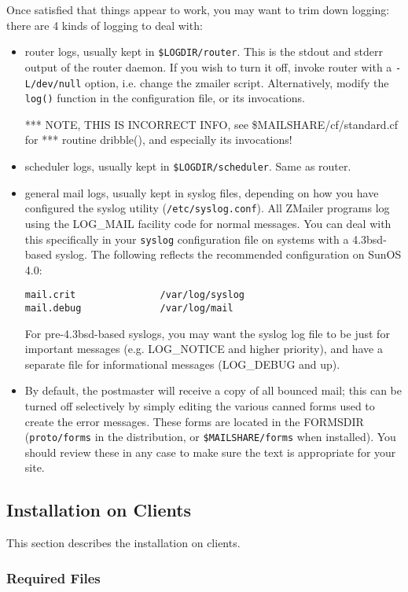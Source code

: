 Once satisfied that things appear to work, you may want to trim down
logging: there are 4 kinds of logging to deal with:
\begin{itemize}
\item router logs, usually kept in {\tt \$LOGDIR/router}.  This is the stdout
and stderr output of the router daemon.  If you wish to turn it off,
invoke router with a {\tt -L/dev/null} option, i.e. change the zmailer
script.  Alternatively, modify the {\tt log()} function in the
configuration file, or its invocations.

*** NOTE, THIS IS INCORRECT INFO, see  \$MAILSHARE/cf/standard.cf for
*** routine   dribble(),  and especially its invocations!
\item scheduler logs, usually kept in {\tt \$LOGDIR/scheduler}.  Same as router.
\item general mail logs, usually kept in syslog files, depending on how
you have configured the syslog utility ({\tt /etc/syslog.conf}).  All
ZMailer programs log using the LOG\_MAIL facility code for normal
messages.  You can deal with this specifically in your {\tt syslog}
configuration file on systems with a 4.3bsd-based syslog.  The
following reflects the recommended configuration on SunOS 4.0:
\begin{verbatim}
mail.crit               /var/log/syslog
mail.debug              /var/log/mail
\end{verbatim}

For pre-4.3bsd-based syslogs, you may want the syslog log file
to be just for important messages (e.g. LOG\_NOTICE and higher
priority), and have a separate file for informational messages
(LOG\_DEBUG and up).
\item By default, the postmaster will receive a copy of all bounced
mail; this can be turned off selectively by simply editing the
various canned forms used to create the error messages.  These
forms are located in the FORMSDIR ({\tt proto/forms} in the distribution,
or {\tt \$MAILSHARE/forms} when installed).  You should review these
in any case to make sure the text is appropriate for your site.
\end{itemize}


\subsection{Installation on Clients}

This section describes the installation on clients.


\subsubsection{Required Files}


